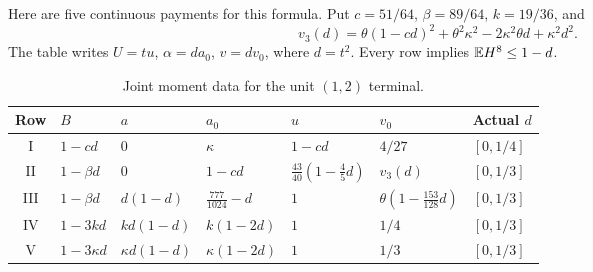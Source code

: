 Here are five continuous payments for this formula. Put
\(c=51/64\), \(\beta=89/64\), \(k=19/36\), and
\[
 v_3(d)=\theta(1-cd)^2+\theta^2\kappa^2
                  -2\kappa^2\theta d+\kappa^2d^2.
\]
The table writes \(U=t u\), \(\alpha=d a_0\), \(v=d v_0\),
where \(d=t^2\). Every row implies \(\mathbb E H^8\le1-d\).
\begin{table}[htbp]\centering\small
\caption{Joint moment data for the unit \((1,2)\) terminal.}
\label{tab:unit-ordinary:two-data}
\setlength{\tabcolsep}{3pt}
\begin{tabular}{@{}cllllll@{}}\toprule
Row & \(B\) & \(a\) & \(a_0\) & \(u\) & \(v_0\) & Actual \(d\)\\\midrule
I & \(1-cd\) & \(0\) & \(\kappa\) & \(1-cd\) & \(4/27\) & \([0,1/4]\)\\
II & \(1-\beta d\) & \(0\) & \(1-cd\) & \(\frac{43}{40}(1-\frac45d)\) & \(v_3(d)\) & \([0,1/3]\)\\
III & \(1-\beta d\) & \(d(1-d)\) & \(\frac{777}{1024}-d\) & \(1\) & \(\theta(1-\frac{153}{128}d)\) & \([0,1/3]\)\\
IV & \(1-3kd\) & \(kd(1-d)\) & \(k(1-2d)\) & \(1\) & \(1/4\) & \([0,1/3]\)\\
V & \(1-3\kappa d\) & \(\kappa d(1-d)\) & \(\kappa(1-2d)\) & \(1\) & \(1/3\) & \([0,1/3]\)\\\bottomrule
\end{tabular}
\end{table}

